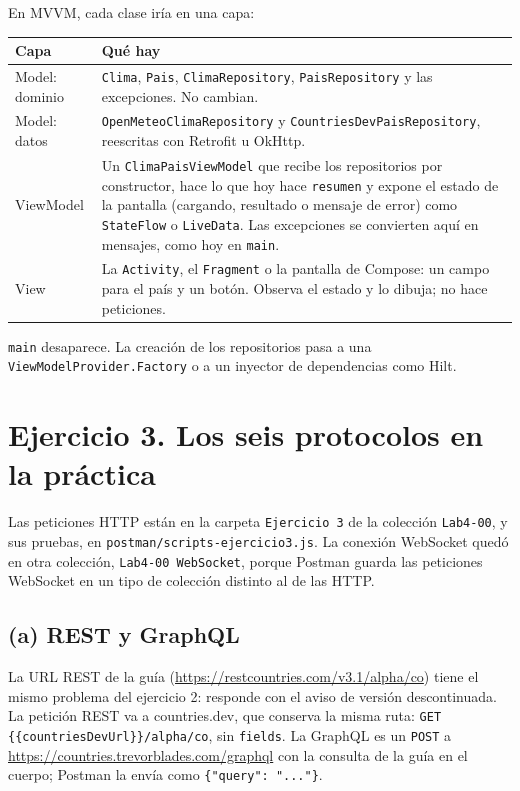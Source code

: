 \documentclass[11pt]{article}
\begin{document}
En MVVM, cada clase iría en una capa:

\begin{center}
\begin{tabular}{@{}>{\raggedright\arraybackslash}p{3.3cm}>{\raggedright\arraybackslash}p{11.6cm}@{}}
\hline
Capa & Qué hay \\
\hline
Model: dominio & \texttt{Clima}, \texttt{Pais}, \texttt{ClimaRepository}, \texttt{PaisRepository} y las excepciones. No cambian. \\
Model: datos & \texttt{OpenMeteoClimaRepository} y \texttt{CountriesDevPaisRepository}, reescritas con Retrofit u OkHttp. \\
ViewModel & Un \texttt{ClimaPaisViewModel} que recibe los repositorios por constructor, hace lo que hoy hace \texttt{resumen} y expone el estado de la pantalla (cargando, resultado o mensaje de error) como \texttt{StateFlow} o \texttt{LiveData}. Las excepciones se convierten aquí en mensajes, como hoy en \texttt{main}. \\
View & La \texttt{Activity}, el \texttt{Fragment} o la pantalla de Compose: un campo para el país y un botón. Observa el estado y lo dibuja; no hace peticiones. \\
\hline
\end{tabular}
\end{center}

\texttt{main} desaparece. La creación de los repositorios pasa a una \texttt{ViewModelProvider.Factory} o a un inyector de dependencias como Hilt.

\section*{Ejercicio 3. Los seis protocolos en la práctica}

Las peticiones HTTP están en la carpeta \texttt{Ejercicio 3} de la colección \texttt{Lab4-00}, y sus pruebas, en \texttt{postman/scripts-ejercicio3.js}. La conexión WebSocket quedó en otra colección, \texttt{Lab4-00 WebSocket}, porque Postman guarda las peticiones WebSocket en un tipo de colección distinto al de las HTTP.

\subsection*{(a) REST y GraphQL}

La URL REST de la guía (\url{https://restcountries.com/v3.1/alpha/co}) tiene el mismo problema del ejercicio 2: responde con el aviso de versión descontinuada. La petición REST va a countries.dev, que conserva la misma ruta: \texttt{GET \{\{countriesDevUrl\}\}/alpha/co}, sin \texttt{fields}. La GraphQL es un \texttt{POST} a \url{https://countries.trevorblades.com/graphql} con la consulta de la guía en el cuerpo; Postman la envía como \texttt{\{"query": "..."\}}.
\end{document}
